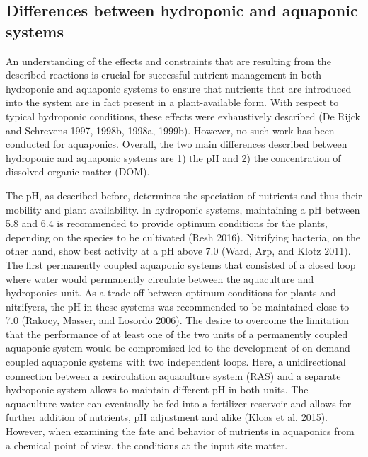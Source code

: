 \documentclass[
]{article}
\begin{document}
\hypertarget{differences-between-hydroponic-and-aquaponic-systems}{%
\subsection{Differences between hydroponic and aquaponic systems}\label{differences-between-hydroponic-and-aquaponic-systems}}

An understanding of the effects and constraints that are resulting from the described reactions is crucial for successful nutrient management in both hydroponic and aquaponic systems to ensure that nutrients that are introduced into the system are in fact present in a plant-available form. With respect to typical hydroponic conditions, these effects were exhaustively described (De Rijck and Schrevens 1997, 1998b, 1998a, 1999b). However, no such work has been conducted for aquaponics.
Overall, the two main differences described between hydroponic and aquaponic systems are 1) the pH and 2) the concentration of dissolved organic matter (DOM).

The pH, as described before, determines the speciation of nutrients and thus their mobility and plant availability. In hydroponic systems, maintaining a pH between 5.8 and 6.4 is recommended to provide optimum conditions for the plants, depending on the species to be cultivated (Resh 2016). Nitrifying bacteria, on the other hand, show best activity at a pH above 7.0 (Ward, Arp, and Klotz 2011). The first permanently coupled aquaponic systems that consisted of a closed loop where water would permanently circulate between the aquaculture and hydroponics unit. As a trade-off between optimum conditions for plants and nitrifyers, the pH in these systems was recommended to be maintained close to 7.0 (Rakocy, Masser, and Losordo 2006). The desire to overcome the limitation that the performance of at least one of the two units of a permanently coupled aquaponic system would be compromised led to the development of on-demand coupled aquaponic systems with two independent loops. Here, a unidirectional connection between a recirculation aquaculture system (RAS) and a separate hydroponic system allows to maintain different pH in both units. The aquaculture water can eventually be fed into a fertilizer reservoir and allows for further addition of nutrients, pH adjustment and alike (Kloas et al. 2015). However, when examining the fate and behavior of nutrients in aquaponics from a chemical point of view, the conditions at the input site matter.
\end{document}
